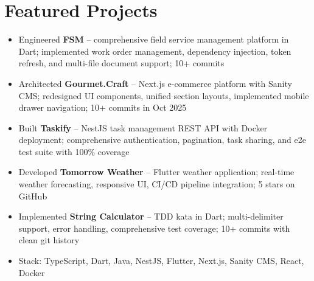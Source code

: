\section{Featured Projects}

\begin{itemize}[nosep]
  \item Engineered \textbf{FSM} -- comprehensive field service management platform in Dart; implemented work order management, dependency injection, token refresh, and multi-file document support; 10+ commits
  \item Architected \textbf{Gourmet.Craft} -- Next.js e-commerce platform with Sanity CMS; redesigned UI components, unified section layouts, implemented mobile drawer navigation; 10+ commits in Oct 2025
  \item Built \textbf{Taskify} -- NestJS task management REST API with Docker deployment; comprehensive authentication, pagination, task sharing, and e2e test suite with 100\% coverage
  \item Developed \textbf{Tomorrow Weather} -- Flutter weather application; real-time weather forecasting, responsive UI, CI/CD pipeline integration; 5 stars on GitHub
  \item Implemented \textbf{String Calculator} -- TDD kata in Dart; multi-delimiter support, error handling, comprehensive test coverage; 10+ commits with clean git history
  \item Stack: TypeScript, Dart, Java, NestJS, Flutter, Next.js, Sanity CMS, React, Docker
\end{itemize}
